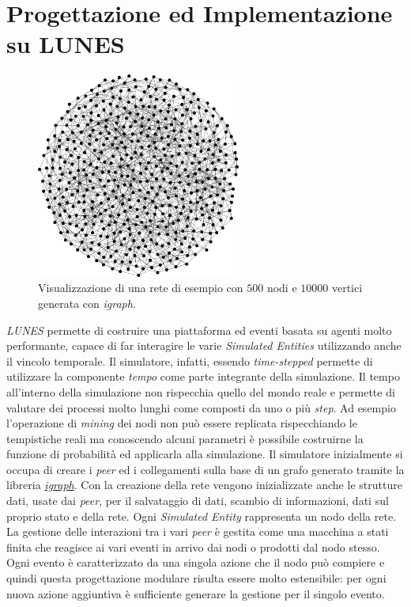 \chapter{Progettazione ed Implementazione su LUNES}

\begin{figure}[H]
    \centering
    \includegraphics[width=0.6\textwidth]{images/network-500.png}
    \caption{Visualizzazione di una rete di esempio con $500$ nodi e $10000$ vertici generata con \textit{igraph}.}
\end{figure}
\textit{LUNES} permette di costruire una piattaforma ed eventi basata su agenti molto performante, capace di far interagire le varie \textit{Simulated Entities} utilizzando anche il vincolo temporale. Il simulatore, infatti, essendo \textit{time-stepped} permette di utilizzare la componente \textit{tempo} come parte integrante della simulazione. Il tempo all'interno della simulazione non rispecchia quello del mondo reale e permette di valutare dei processi molto lunghi come composti da uno o più \textit{step}. Ad esempio l'operazione di \textit{mining} dei nodi non può essere replicata rispecchiando le tempistiche reali ma conoscendo alcuni parametri è possibile costruirne la funzione di probabilità ed applicarla alla simulazione.\newline
Il simulatore inizialmente si occupa di creare i \textit{peer} ed i collegamenti sulla base di un grafo generato tramite la libreria \href{https://igraph.org/}{\textit{igraph}}. Con la creazione della rete vengono inizializzate anche le strutture dati, usate dai \textit{peer}, per il salvataggio di dati, scambio di informazioni, dati sul proprio stato e della rete. Ogni \textit{Simulated Entity} rappresenta un nodo della rete.\newline
La gestione delle interazioni tra i vari \textit{peer} è gestita come una macchina a stati finita che reagisce ai vari eventi in arrivo dai nodi o prodotti dal nodo stesso. Ogni evento è caratterizzato da una singola azione che il nodo può compiere e quindi questa progettazione modulare risulta essere molto estensibile: per ogni nuova azione aggiuntiva è sufficiente generare la gestione per il singolo evento.\newline
